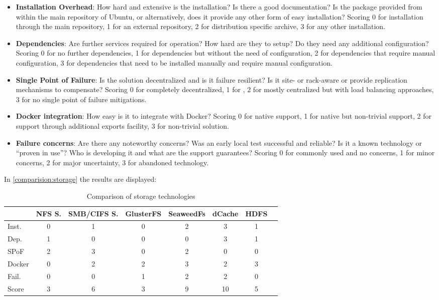 \begin{itemize}
\item \textbf{Installation Overhead}:
How hard and extensive is the installation?
Is there a good documentation?
Is the package provided from within the main repository of Ubuntu, or alternatively, does it provide any other form of easy installation?
Scoring 0 for installation through the main repository, 1 for an external repository, 2 for distribution specific archive, 3 for any other installation.

\item \textbf{Dependencies}:
Are further services required for operation? 
How hard are they to setup?
Do they need any additional configuration?
Scoring 0 for no further dependencies, 1 for dependencies but without the need of configuration,  2 for dependencies that require manual configuration, 3 for dependencies that need to be installed manually and require manual configuration.

\item \textbf{Single Point of Failure}:
Is the solution decentralized and is it failure resilient?
Is it site- or rack-aware or provide replication mechanisms to compensate?
Scoring 0 for completely decentralized, 1 for , 2 for mostly centralized but with load balancing approaches, 3 for no single point of failure mitigations.

\item \textbf{Docker integration}:
How easy is it to integrate with Docker?
Scoring 0 for native support, 1 for native but non-trivial support, 2 for support through additional exports facility, 3 for non-trivial solution.

\item \textbf{Failure concerns}:
Are there any noteworthy concerns?
Was an early local test successful and reliable?
Is it a known technology or \enquote{proven in use}?
Who is developing it and what are the support guarantees?
Scoring 0 for commonly used and no concerns, 1 for minor concerns, 2 for major uncertainty, 3 for abandoned technology.
\end{itemize}

In \autoref{comparision:storage} the results are displayed:

\begin{table}[H]
	\begin{tabular}{l|c|c|c|c|c|c|c}
				& NFS S.& SMB/CIFS S.& GlusterFS & SeaweedFs	& dCache 	& HDFS \\
		\hline
		Inst. 	& 0 	& 1 		& 0 		& 2 		& 3			& 1 \\
		Dep. 	& 1 	& 0			& 0 		& 0 		& 3 		& 1 \\
		SPoF 	& 2		& 3			& 0			& 2 		& 0			& 0 \\
		Docker 	& 0 	& 2 		& 2 		& 3 		& 2 		& 3 \\
		Fail.	& 0		& 0			& 1			& 2			& 2			& 0 \\
		\hline
		Score 	& 3		& 6			& 3			& 9			& 10		& 5 \\
	\end{tabular}
	\caption{Comparison of storage technologies}
	\label{comparision:storage}
\end{table}

